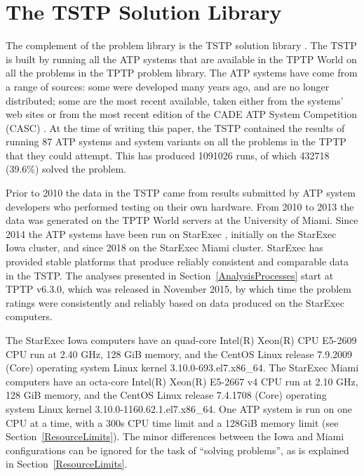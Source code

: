 \documentclass[runningheads]{llncs}
\begin{document}
\section{The TSTP Solution Library}
\label{TSTP}

The complement of the problem library is the TSTP solution library \cite{Sut07-CSR,Sut10}.
The TSTP is built by running all the ATP systems that are available in the TPTP World on
all the problems in the TPTP problem library.
The ATP systems have come from a range of sources:
some were developed many years ago, and are no longer distributed;
some are the most recent available, taken either from the systems’ web sites or from the most 
recent edition of the CADE ATP System Competition (CASC) \cite{Sut16}.
At the time of writing this paper, the TSTP contained the results of running 87 ATP systems and 
system variants on all the problems in the TPTP that they could attempt.
This has produced 1091026 runs, of which 432718 (39.6\%) solved the problem.

Prior to 2010 the data in the TSTP came from results submitted by ATP system developers who
performed testing on their own hardware.
From 2010 to 2013 the data was generated on the TPTP World servers at the University of Miami.
Since 2014 the ATP systems have been run on StarExec \cite{SST14}, initially on the StarExec
Iowa cluster, and since 2018 on the StarExec Miami cluster.
StarExec has provided stable platforms that produce reliably consistent and comparable data in
the TSTP.
The analyses presented in Section~\ref{AnalysisProcesses} start at TPTP v6.3.0, which was released 
in November 2015, by which time the problem ratings were consistently and reliably based on data 
produced on the StarExec computers.

The StarExec Iowa computers have an 
quad-core Intel(R) Xeon(R) CPU E5-2609 CPU run at 2.40 GHz,
128 GiB memory,
and the CentOS Linux release 7.9.2009 (Core) operating system
Linux kernel 3.10.0-693.el7.x86\_64.
The StarExec Miami computers have an
octa-core Intel(R) Xeon(R) E5-2667 v4 CPU run at 2.10 GHz,
128 GiB memory,
and the CentOS Linux release 7.4.1708 (Core) operating system
Linux kernel 3.10.0-1160.62.1.el7.x86\_64.
One ATP system is run on one CPU at a time, with a 300s CPU time limit and a 128GiB memory
limit (see Section~\ref{ResourceLimits}).
The minor differences between the Iowa and Miami configurations can be ignored for the task
of ``solving problems'', as is explained in Section~\ref{ResourceLimits}.
\end{document}

